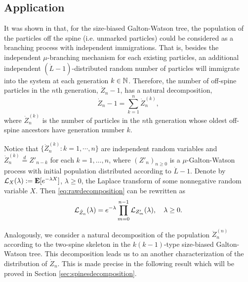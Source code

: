 \documentclass[12pt]{amsart}
\theoremstyle{remark}
\numberwithin{equation}{section}
\newcommand{\eqlaw}{\overset{d}{=}}
\newcommand{\bE}{\mathbf E}\newcommand{\bbE}{\mathbb E}\newcommand{\cE}{\mathcal E}
\begin{document}
\subsection{Application}	
It was shown in \cite{lyons1995conceptual} that,
for the size-biased Galton-Watson tree, 
	the population of the particles off the spine (i.e. unmarked particles) could be considered as a branching process with independent immigrations. That is, besides the independent $\mu$-branching mechanism for each existing particles, an additional independent $(\dot L-1)$-distributed random number of particles will immigrate into the system at each generation $k\in\mathbb N$. Therefore, the number of off-spine particles in the $n$th generation, $\dot Z_n-1$, has a natural decomposition,
\begin{equation}
\label{eq:rawdecomposition}
		\dot Z_n-1
	=
		\sum_{k=1}^{n}\dot Z_n^{(k)},
\end{equation}
	where $\dot Z^{(k)}_n$ is the number of particles in the $n$th generation whose oldest off-spine ancestors have generation number $k$.
\par	
Notice that $\{\dot Z_n^{(k)}: k=1,\cdots,n\}$ are independent random 
variables and $\dot Z_n^{(k)}\eqlaw Z'_{n-k}$ for each 
$k=1, \dots, n$, where $(Z'_n)_{n\ge0}$ is
a $\mu$-Galton-Watson process with initial population
 distributed according to $\dot L-1$. Denote by
$\cL_X(\lambda):=\bE[e^{-\lambda X}]$, $\lambda \geq 0$,
the Laplace  transform of some nonnegative random variable $X$. 
Then \eqref{eq:rawdecomposition} can be rewritten as
\begin{equation}
\label{eq:spinedecomposition}
		\mathcal L_{\dot Z_n}(\lambda)
	=
		e^{-\lambda}\prod_{m=0}^{n-1} \mathcal L_{Z'_m}(\lambda),
\quad \lambda \geq 0.
\end{equation}
\par
Analogously, 
we consider a natural decomposition of the population $\ddot Z_n^{(n)}$ 
according to the two-spine skeleton in the $k(k-1)$-type 
size-biased Galton-Watson tree. This decomposition leads us to an 
another characterization of the distribution of $\dot Z_n$.
This is made precise in the following result which will be proved in Section \ref{sec:spinesdecomposition}.
\end{document}

